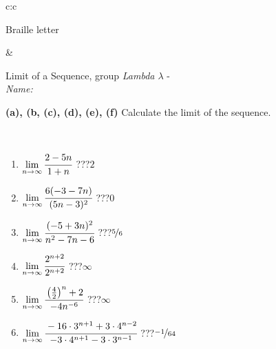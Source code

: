 \documentclass[10pt]{report}
\begin{document}
\begin{tabular}{c:c}
\begin{minipage}[c][104.5mm][t]{0.5\linewidth}
\begin{center}
\begin{minipage}{0.20\linewidth}
\begin{center}
{\small Braille letter}
\end{center}
\end{minipage}
\end{center}
\end{minipage}
&
\begin{minipage}[c][104.5mm][t]{0.5\linewidth}
\begin{center}
\vspace{5mm}
{\huge Limit of a Sequence, group \textit{Lambda $\lambda$} -}\\[5mm]
\textit{Name:}\phantom{xxxxxxxxxxxxxxxxxxxxxxxxxxxxxxxxxxxxxxxxxxxxxxxxxxxxxxxxxxxxxxxxx}\\[5mm]
\begin{minipage}{0.95\linewidth}
\begin{center}
{
\textbf{(a), (b, (c), (d), (e), (f)} Calculate the limit of the sequence. \\[-1mm]
\phantom{x}
}
\end{center}
\end{minipage}
\\[1mm]
\begin{minipage}{0.79\linewidth}
\begin{center}
\begin{varwidth}{\linewidth}
\setlength{\itemsep}{0pt}
\begin{enumerate}
\normalsize
\item $\lim\limits_{n\to\infty}\cfrac{2-5n}{1+n}$\quad \dotfill\; ???\;\dotfill \quad $2$
\item $\lim\limits_{n\to\infty}\cfrac{6(-3-7n)}{(5n-3)^2}$\quad \dotfill\; ???\;\dotfill \quad $0$
\item $\lim\limits_{n\to\infty}\cfrac{(-5+3n)^2}{n^2-7n-6}$\quad \dotfill\; ???\;\dotfill \quad $\nicefrac{5}{6}$
\item $\lim\limits_{n\to\infty}\cfrac{2^{n+2}}{2^{n+2}}$\quad \dotfill\; ???\;\dotfill \quad $\infty$
\item $\lim\limits_{n\to\infty}\cfrac{\left(\frac{4}{2}\right)^n +2}{-4n^{-6}}$\quad \dotfill\; ???\;\dotfill \quad $\infty$
\item $\lim\limits_{n\to\infty}\cfrac{-16\cdot 3^{n+1}+3\cdot 4^{n-2}}{-3\cdot 4^{n+1}-3\cdot 3^{n-1}}$\quad \dotfill\; ???\;\dotfill \quad $\nicefrac{-1}{64}$
\end{enumerate}
\end{varwidth}
\end{center}
\end{minipage}
\begin{minipage}{0.20\linewidth}

\end{minipage}
\end{center}
\end{minipage}
\end{tabular}
\end{document}
